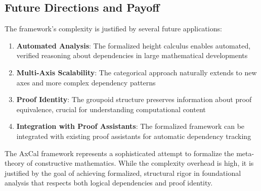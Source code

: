 \documentclass[11pt]{article}
\theoremstyle{plain}
\theoremstyle{definition}
\begin{document}
\subsection{Future Directions and Payoff}

The framework's complexity is justified by several future applications:

\begin{enumerate}
\item \textbf{Automated Analysis}: The formalized height calculus enables automated, verified reasoning about dependencies in large mathematical developments
\item \textbf{Multi-Axis Scalability}: The categorical approach naturally extends to new axes and more complex dependency patterns
\item \textbf{Proof Identity}: The groupoid structure preserves information about proof equivalence, crucial for understanding computational content
\item \textbf{Integration with Proof Assistants}: The formalized framework can be integrated with existing proof assistants for automatic dependency tracking
\end{enumerate}

The AxCal framework represents a sophisticated attempt to formalize the meta-theory of constructive mathematics. While the complexity overhead is high, it is justified by the goal of achieving formalized, structural rigor in foundational analysis that respects both logical dependencies and proof identity.
\end{document}
